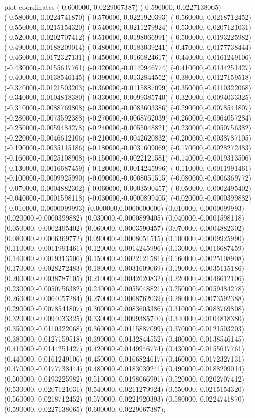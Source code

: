  plot coordinates {(-0.600000,-0.0229067387) (-0.590000,-0.0227138065) (-0.580000,-0.0224741870) (-0.570000,-0.0221920393) (-0.560000,-0.0218712452) (-0.550000,-0.0215154320) (-0.540000,-0.0211279924) (-0.530000,-0.0207121031) (-0.520000,-0.0202707412) (-0.510000,-0.0198066991) (-0.500000,-0.0193225982) (-0.490000,-0.0188209014) (-0.480000,-0.0183039241) (-0.470000,-0.0177738444) (-0.460000,-0.0172327131) (-0.450000,-0.0166824617) (-0.440000,-0.0161249106) (-0.430000,-0.0155617761) (-0.420000,-0.0149946774) (-0.410000,-0.0144251427) (-0.400000,-0.0138546145) (-0.390000,-0.0132844552) (-0.380000,-0.0127159518) (-0.370000,-0.0121503203) (-0.360000,-0.0115887099) (-0.350000,-0.0110322068) (-0.340000,-0.0104818380) (-0.330000,-0.0099385740) (-0.320000,-0.0094033325) (-0.310000,-0.0088769808) (-0.300000,-0.0083603386) (-0.290000,-0.0078541807) (-0.280000,-0.0073592388) (-0.270000,-0.0068762039) (-0.260000,-0.0064057284) (-0.250000,-0.0059484278) (-0.240000,-0.0055048821) (-0.230000,-0.0050756382) (-0.220000,-0.0046612106) (-0.210000,-0.0042620832) (-0.200000,-0.0038787105) (-0.190000,-0.0035115186) (-0.180000,-0.0031609069) (-0.170000,-0.0028272483) (-0.160000,-0.0025108908) (-0.150000,-0.0022121581) (-0.140000,-0.0019313506) (-0.130000,-0.0016687459) (-0.120000,-0.0014245996) (-0.110000,-0.0011991461) (-0.100000,-0.0009925990) (-0.090000,-0.0008051515) (-0.080000,-0.0006369772) (-0.070000,-0.0004882302) (-0.060000,-0.0003590457) (-0.050000,-0.0002495402) (-0.040000,-0.0001598118) (-0.030000,-0.0000899405) (-0.020000,-0.0000399882) (-0.010000,-0.0000099993) (0.000000,0.0000000000) (0.010000,-0.0000099993) (0.020000,-0.0000399882) (0.030000,-0.0000899405) (0.040000,-0.0001598118) (0.050000,-0.0002495402) (0.060000,-0.0003590457) (0.070000,-0.0004882302) (0.080000,-0.0006369772) (0.090000,-0.0008051515) (0.100000,-0.0009925990) (0.110000,-0.0011991461) (0.120000,-0.0014245996) (0.130000,-0.0016687459) (0.140000,-0.0019313506) (0.150000,-0.0022121581) (0.160000,-0.0025108908) (0.170000,-0.0028272483) (0.180000,-0.0031609069) (0.190000,-0.0035115186) (0.200000,-0.0038787105) (0.210000,-0.0042620832) (0.220000,-0.0046612106) (0.230000,-0.0050756382) (0.240000,-0.0055048821) (0.250000,-0.0059484278) (0.260000,-0.0064057284) (0.270000,-0.0068762039) (0.280000,-0.0073592388) (0.290000,-0.0078541807) (0.300000,-0.0083603386) (0.310000,-0.0088769808) (0.320000,-0.0094033325) (0.330000,-0.0099385740) (0.340000,-0.0104818380) (0.350000,-0.0110322068) (0.360000,-0.0115887099) (0.370000,-0.0121503203) (0.380000,-0.0127159518) (0.390000,-0.0132844552) (0.400000,-0.0138546145) (0.410000,-0.0144251427) (0.420000,-0.0149946774) (0.430000,-0.0155617761) (0.440000,-0.0161249106) (0.450000,-0.0166824617) (0.460000,-0.0172327131) (0.470000,-0.0177738444) (0.480000,-0.0183039241) (0.490000,-0.0188209014) (0.500000,-0.0193225982) (0.510000,-0.0198066991) (0.520000,-0.0202707412) (0.530000,-0.0207121031) (0.540000,-0.0211279924) (0.550000,-0.0215154320) (0.560000,-0.0218712452) (0.570000,-0.0221920393) (0.580000,-0.0224741870) (0.590000,-0.0227138065) (0.600000,-0.0229067387)};
